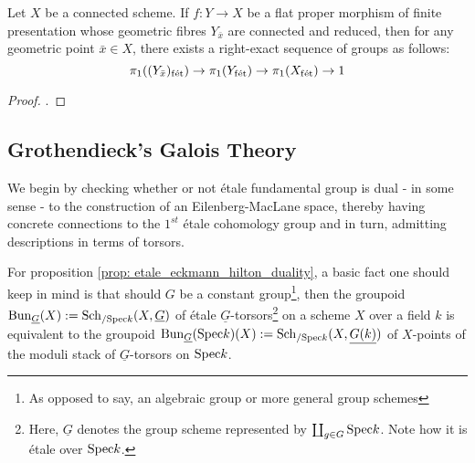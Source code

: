        \begin{proposition} \label{prop: etale_homotopy_exact_sequence}
            Let $X$ be a connected scheme. If $f: Y \to X$ be a flat proper morphism of finite presentation whose geometric fibres $Y_{\bar{x}}$ are connected and reduced, then for any geometric point $\bar{x} \in X$, there exists a right-exact sequence of groups as follows:
                $$\pi_1((Y_{\bar{x}})_{\mathrm{f\acute{e}t}}) \to \pi_1(Y_{\mathrm{f\acute{e}t}}) \to \pi_1(X_{\mathrm{f\acute{e}t}}) \to 1$$
        \end{proposition}
            \begin{proof}
                \cite[\href{https://stacks.math.columbia.edu/tag/0C0J}{Tag 0C0J}]{stacks}.
            \end{proof}
    
    \subsection{Grothendieck's Galois Theory}
        We begin by checking whether or not \'etale fundamental group is dual - in some sense - to the construction of an Eilenberg-MacLane space, thereby having concrete connections to the $1^{st}$ \'etale cohomology group and in turn, admitting descriptions in terms of torsors.
        \begin{remark}
            For proposition \ref{prop: etale_eckmann_hilton_duality}, a basic fact one should keep in mind is that should $G$ be a constant group\footnote{As opposed to say, an algebraic group or more general group schemes}, then the groupoid $\mathrm{Bun}_{\underline{G}}(X) := \mathrm{Sch}_{/\mathrm{Spec} k}(X, \underline{G})$ of \'etale $\underline{G}$-torsors\footnote{Here, $\underline{G}$ denotes the group scheme represented by $\coprod_{g \in G} \mathrm{Spec} k$. Note how it is \'etale over $\mathrm{Spec} k$.} on a scheme $X$ over a field $k$ is equivalent to the groupoid $\mathrm{Bun}_{\underline{G}}(\mathrm{Spec} k)(X) := \mathrm{Sch}_{/\mathrm{Spec} k}(X, \underline{G(k)})$ of $X$-points of the moduli stack of $\underline{G}$-torsors on $\mathrm{Spec} k$.
        \end{remark}
